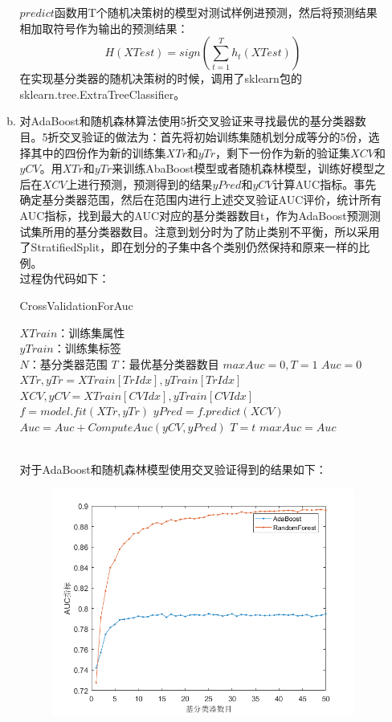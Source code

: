 \documentclass[a4paper,UTF8]{article}
\numberwithin{equation}{section}
\begin{document}
\begin{enumerate}[1.]
\begin{enumerate}[a.]
$predict$函数用T个随机决策树的模型对测试样例进预测，然后将预测结果相加取符号作为输出的预测结果：
\begin{equation}
H(XTest) = sign(\sum_{t=1}^{T}h_t(XTest))
\end{equation}
在实现基分类器的随机决策树的时候，调用了sklearn包的sklearn.tree.ExtraTreeClassifier。
\item 对AdaBoost和随机森林算法使用5折交叉验证来寻找最优的基分类器数目。5折交叉验证的做法为：首先将初始训练集随机划分成等分的5份，选择其中的四份作为新的训练集$XTr$和$yTr$，剩下一份作为新的验证集$XCV$和$yCV$。用$XTr$和$yTr$来训练AbaBoost模型或者随机森林模型，训练好模型之后在$XCV$上进行预测，预测得到的结果$yPred$和$yCV$计算AUC指标。事先确定基分类器范围，然后在范围内进行上述交叉验证AUC评价，统计所有AUC指标，找到最大的AUC对应的基分类器数目t，作为AdaBoost预测测试集所用的基分类器数目。注意到划分时为了防止类别不平衡，所以采用了StratifiedSplit，即在划分的子集中各个类别仍然保持和原来一样的比例。\\
过程伪代码如下：
\begin{algorithm}[!h]  
	\caption{CrossValidationForAuc}  
	\begin{algorithmic}[1]  
		\Require
		$XTrain$：训练集属性\\
		$yTrain$：训练集标签\\
		$N$：基分类器范围
		\Ensure  
		$T$：最优基分类器数目
		\State $maxAuc = 0, T = 1$
		\State $Auc = 0$
		\State $XTr, yTr = XTrain[TrIdx], yTrain[TrIdx]$
		\State $XCV, yCV = XTrain[CVIdx], yTrain[CVIdx]$
		\State $f = model.fit(XTr, yTr)$
		\State $yPred = f.predict(XCV)$
		\State $Auc = Auc + ComputeAuc(yCV,yPred)$
		\EndFor
		\State $T = t$
		\State $maxAuc = Auc$
		\EndIf
		\EndFor
		\label{code:End3}  
	\end{algorithmic}  
\end{algorithm}\\
对于AdaBoost和随机森林模型使用交叉验证得到的结果如下：\\
\begin{figure}[!ht]
	\centering
	\includegraphics[scale=0.5]{auc.png}

\end{figure}
\end{enumerate}
\end{enumerate}
\end{document}
